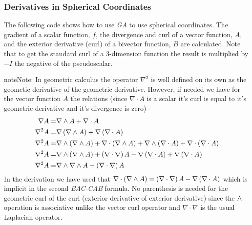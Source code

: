 \documentclass[letterpaper,10pt,english]{sphinxmanual}
\begin{document}
\subsubsection{Derivatives in Spherical Coordinates}
\label{GA:derivatives-in-spherical-coordinates}
The following code shows how to use \emph{GA} to use spherical coordinates.
The gradient of a scalar function, $f$, the divergence and curl
of a vector function, $A$, and the exterior derivative (curl) of
a bivector function, $B$ are calculated.  Note that to get the
standard curl of a 3-dimension function the result is multiplied by
$-I$ the negative of the pseudoscalar.

\begin{notice}{note}{Note:}
In geometric calculus the operator $\nabla^{2}$ is well defined
on its own as the geometic derivative of the geometric derivative.
However, if needed we have for the vector function $A$ the relations
(since $\nabla\cdot A$ is a scalar it's curl is equal to it's
geometric derivative and it's divergence is zero) -
\begin{align*}
\nabla A =& \nabla\wedge A + \nabla\cdot A \\
\nabla^{2} A =& \nabla\left ( {\nabla\wedge A} \right ) + \nabla\left ( {\nabla\cdot A} \right ) \\
\nabla^{2} A =& \nabla\wedge\left ( {\nabla\wedge A} \right ) + \nabla\cdot\left ( {\nabla\wedge A} \right )
+\nabla\wedge\left ( {\nabla\cdot A} \right ) + \nabla\cdot\left ( {\nabla\cdot A} \right ) \\
\nabla^{2} A =& \nabla\wedge\left ( {\nabla\wedge A} \right ) + \left ( {\nabla\cdot\nabla} \right ) A
- \nabla\left ( {\nabla\cdot A} \right ) + \nabla\left ( {\nabla\cdot A} \right ) \\
\nabla^{2} A =& \nabla\wedge\nabla\wedge A + \left ( {\nabla\cdot\nabla} \right ) A
\end{align*}
In the derivation we have used that $\nabla\cdot\left ( {\nabla\wedge A} \right ) = \left ( {\nabla\cdot\nabla} \right ) A - \nabla\left ( {\nabla\cdot A} \right )$
which is implicit in the second \emph{BAC-CAB} formula.
No parenthesis is needed for the geometric curl of the curl (exterior derivative of exterior derivative)
since the $\wedge$ operation is associative unlike the vector curl operator and $\nabla\cdot\nabla$ is the usual Laplacian
operator.
\end{notice}
\end{document}
